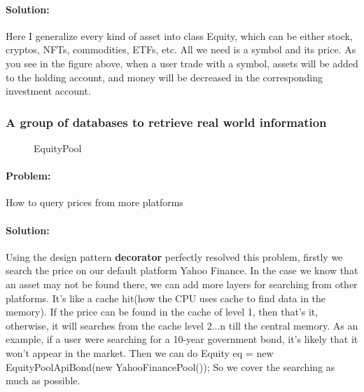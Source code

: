 \documentclass[a4paper,12pt]{report}
\begin{document}
	\paragraph*{Solution:} Here I generalize every kind of asset into class Equity, which can be either stock, cryptos, NFTs, commodities, ETFs, etc. All we need is a symbol and its price. As you see in the figure above, when a user trade with a symbol, assets will be added to the holding account, and money will be decreased in the corresponding investment account.

\subsubsection*{A group of databases to retrieve real world information}
\begin{figure}[H]
	\centering{}
	\caption{EquityPool}
	\label{img:EquityPool}
	\end{figure}

	\paragraph{Problem:} How to query prices from more platforms

	\paragraph*{Solution:}Using the design pattern \textbf{decorator} perfectly resolved this problem, firstly we search the price on our default platform Yahoo Finance. In the case we know that an asset may not be found there, we can add more layers for searching from other platforms. It's like a cache hit(how the CPU uses cache to find data in the memory). If the price can be found in the cache of level 1, then that's it, otherwise, it will searches from the cache level 2...n till the central memory. 
	As an example, if a user were searching for a 10-year government bond, it's likely that it won't appear in the market. Then we can do Equity eq = new EquityPoolApiBond(new YahooFinancePool());  So we cover the searching as much as possible.
\end{document}

